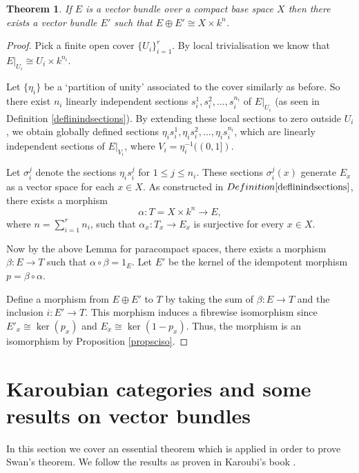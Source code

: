 \documentclass[12pt]{report}
\numberwithin{equation}{section}
\newtheorem{theorem}[dummy]{Theorem}
\begin{document}
	\begin{theorem}\label{stablytrivialcompact}
		If $E$ is a vector bundle over a compact base space $X$ then there exists a vector bundle $E'$ such that $E \oplus E' \cong X \times k^n$.
	\end{theorem}
	\begin{proof}
		Pick a finite open cover \( \{ U_i \}_{i=1}^r \). By local trivialisation we know that \( E|_{U_i} \cong U_i \times k^{n_i} \). 
		
		Let \( \{\eta_i\} \) be a `partition of unity' associated to the cover similarly as before. So there exist \( n_i \) linearly independent sections \( s_i^1, s_i^2, \dots, s_i^{n_i} \) of \( E|_{U_i} \) (as seen in Definition \ref{deflinindsections}). By extending these local sections to zero outside \( U_i \), we obtain globally defined sections \( \eta_i s_i^1, \eta_i s_i^2, \dots, \eta_i s_i^{n_i} \), which are linearly independent sections of \( E|_{V_i} \), where \( V_i = \eta_i^{-1}((0,1]) \).
		
		Let \( \sigma_i^j \) denote the sections \( \eta_i s_i^j \) for \( 1 \leq j \leq n_i \). These sections \( \sigma_i^j(x) \) generate \( E_x \) as a vector space for each \( x \in X \). As constructed in $Definition \ref{deflinindsections}$, there exists a morphism
		\[
		\alpha: T = X \times k^n \to E,
		\]
		where \( n = \sum_{i=1}^r n_i \), such that \( \alpha_x: T_x \to E_x \) is surjective for every \( x \in X \).
		
		Now by the above Lemma for paracompact spaces, there exists a morphism \( \beta: E \to T \) such that \( \alpha \circ \beta = 1_E \). Let \( E' \) be the kernel of the idempotent morphism \( p = \beta \circ \alpha \). 
		
		Define a morphism from \( E \oplus E' \) to \( T \) by taking the sum of $\beta: E\to T $ and the inclusion $i: E' \to T$. This morphism induces a fibrewise isomorphism since \( E'_x \cong \ker(p_x) \) and \( E_x \cong \ker(1-p_x) \). Thus, the morphism is an isomorphism by Proposition \ref{propsciso}.
	\end{proof}
	
	\section{Karoubian categories and some results on vector bundles}
	In this section we cover an essential theorem which is applied in order to prove Swan's theorem. We follow the results as proven in Karoubi's book \cite{karoubi2008k}.
	
\end{document}
